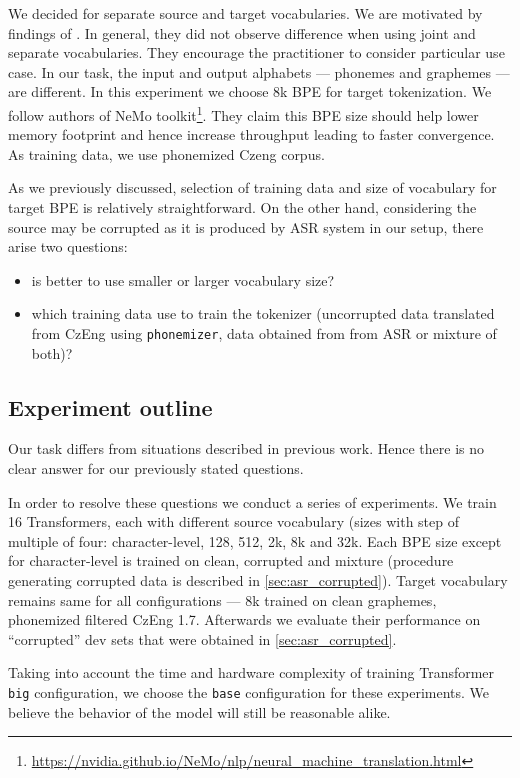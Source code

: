 We decided for separate source and target vocabularies. We are motivated by findings of . In general, they did not observe difference when using joint and separate vocabularies. They encourage the practitioner to consider particular use case. In our task, the input and output alphabets --- phonemes and graphemes --- are different. In this experiment we choose 8k BPE for target tokenization. We follow authors of NeMo toolkit\footnote{\url{https://nvidia.github.io/NeMo/nlp/neural_machine_translation.html}}. They claim this BPE size should help lower memory footprint and hence increase throughput leading to faster convergence. As training data, we use phonemized Czeng corpus. 

As we previously discussed, selection of training data and size of vocabulary for target BPE is relatively straightforward. On the other hand, considering the source may be corrupted as it is produced by ASR system in our setup, there arise two questions: 

\begin{itemize}
    \item is better to use smaller or larger vocabulary size?
    \item which training data use to train the tokenizer (uncorrupted data translated from CzEng using \texttt{phonemizer}, data obtained from from ASR or mixture of both)?
\end{itemize}



\subsection{Experiment outline}
Our task differs from situations described in previous work. Hence there is no clear answer for our previously stated questions.

In order to resolve these questions we conduct a series of experiments. We train 16 Transformers, each with different source vocabulary (sizes with step of multiple of four: character-level, 128, 512, 2k, 8k and 32k. Each BPE size except for character-level is trained on clean, corrupted and mixture (procedure generating corrupted data is described in \cref{sec:asr_corrupted}). Target vocabulary remains same for all configurations --- 8k trained on clean graphemes, phonemized filtered CzEng 1.7. Afterwards we evaluate their performance on ``corrupted'' dev sets that were obtained in \cref{sec:asr_corrupted}.

Taking into account the time and hardware complexity of training Transformer \texttt{big} configuration, we choose the \texttt{base} configuration for these experiments. We believe the behavior of the model will still be reasonable alike.

